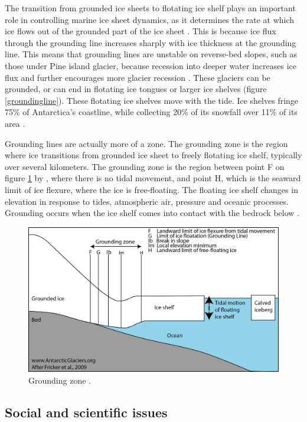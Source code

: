 \documentclass[a4paper,12pt]{article}
\begin{document}
The transition from grounded ice sheets to flotating ice shelf plays an important role in controlling marine ice sheet dynamics, as it determines the rate at which ice flows out of the grounded part of the ice sheet \cite[]{schoof2007ice}. This is because ice flux through the grounding line increases sharply with ice thickness at the grounding line. This means that grounding lines are unstable on reverse-bed slopes, such as those under Pine island glacier, because recession into deeper water increases ice flux and further encourages more glacier recession \cite[]{schoof2007marine}. These glaciers can be grounded, or can end in flotating ice tongues or larger ice shelves (figure \ref{groundingline}). These flotating ice shelves move with the tide. Ice shelves fringe 75\% of Antarctica's coastline, while collecting 20\% of its snowfall over 11\% of its area \cite[]{rignot2013ice}.

Grounding lines are actually more of a zone. The grounding zone is the region where ice transitions from grounded ice sheet to freely flotating ice shelf, typically over several kilometers. The grounding zone is the region between point F on figure \ref{groundingzone} by \cite{fricker2009mapping}, where there is no tidal movement, and point H, which is the seaward limit of ice flexure, where the ice is free-floating. The floating ice shelf changes in elevation in response to tides, atmospheric air, pressure and oceanic processes. Grounding occurs when the ice shelf comes into contact with the bedrock below \cite[]{fricker2009mapping}.

\begin{figure}[!h]
	\centering
	\includegraphics[width=0.7\linewidth]{../fig/groundingzone}
	\caption{Grounding zone \cite[]{fricker2009mapping}.}
	\label{groundingzone}
\end{figure}


\subsection{Social and scientific issues}
\end{document}

